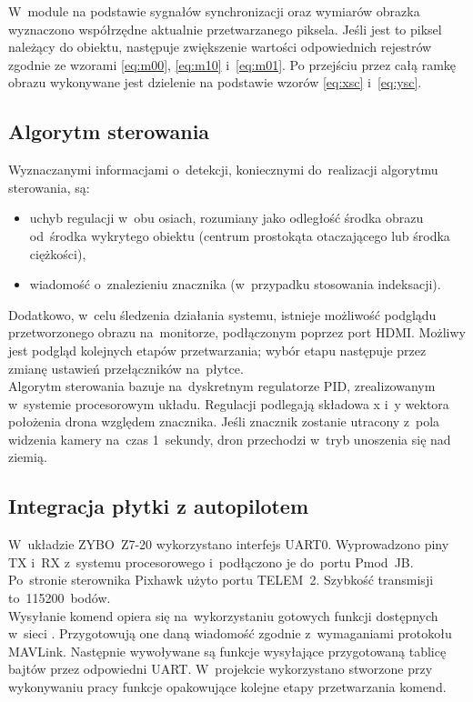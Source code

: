 W~module na podstawie sygnałów synchronizacji oraz wymiarów obrazka wyznaczono współrzędne aktualnie przetwarzanego piksela. 
Jeśli jest to piksel należący do obiektu, następuje zwiększenie wartości odpowiednich rejestrów zgodnie ze wzorami
\ref{eq:m00}, \ref{eq:m10} i~\ref{eq:m01}. 
Po przejściu przez całą ramkę obrazu wykonywane jest dzielenie na podstawie wzorów \ref{eq:xsc} i~\ref{eq:ysc}.\\
\subsection{Algorytm sterowania}
\label{sec:algorytm_sterowania}
Wyznaczanymi informacjami o~detekcji, koniecznymi do~realizacji algorytmu sterowania, są:
\begin{itemize}
	\item uchyb regulacji w~obu osiach, rozumiany jako odległość środka obrazu od~środka wykrytego obiektu (centrum prostokąta otaczającego lub środka ciężkości),
	\item wiadomość o~znalezieniu znacznika (w~przypadku stosowania indeksacji).
\end{itemize}
Dodatkowo, w~celu śledzenia działania systemu, istnieje możliwość podglądu przetworzonego obrazu na~monitorze, podłączonym poprzez port HDMI. Możliwy jest podgląd kolejnych etapów przetwarzania; wybór etapu następuje przez zmianę ustawień przełączników na~płytce.\\
Algorytm sterowania bazuje na~dyskretnym regulatorze PID, zrealizowanym w~systemie procesorowym układu. Regulacji podlegają składowa x i~y wektora położenia drona względem znacznika. Jeśli znacznik zostanie utracony z~pola widzenia kamery na~czas 1~sekundy, dron przechodzi w~tryb unoszenia się nad ziemią.
\subsection{Integracja płytki z autopilotem}
\label{sec:integracja_plytka_autopilot}
W~układzie ZYBO~Z7-20 wykorzystano interfejs UART0. Wyprowadzono piny TX i~RX z~systemu procesorowego i~podłączono je do~portu Pmod~JB. Po~stronie sterownika Pixhawk użyto portu TELEM~2. Szybkość transmisji to~115200~bodów.\\
Wysyłanie komend opiera się na~wykorzystaniu gotowych funkcji dostępnych w~sieci \cite{github_mavlink}. Przygotowują one daną wiadomość zgodnie z~wymaganiami protokołu MAVLink. Następnie wywoływane są funkcje wysyłające przygotowaną tablicę bajtów przez odpowiedni UART. W~projekcie wykorzystano stworzone przy wykonywaniu pracy \cite{mgr} funkcje opakowujące kolejne etapy przetwarzania komend.
